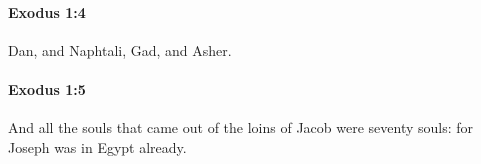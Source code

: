 		\paragraph{Exodus 1:4} %
			\label{EXODUS-1-4}

			Dan, and Naphtali, Gad, and Asher.


		\paragraph{Exodus 1:5} %
			\label{EXODUS-1-5}

			And all the souls that came out of the loins of Jacob were seventy souls: for Joseph was in Egypt already.



